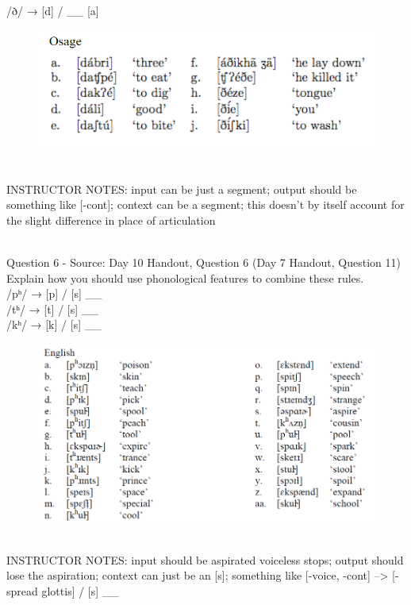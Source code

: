 \documentclass[12pt]{article}
\begin{document}
/ð/ → {[d]} / \_\_ {[a]}

\begin{figure}[H]
\includegraphics{../images/osage.png}
\end{figure}

~\\
INSTRUCTOR NOTES: input can be just a segment; output should be something like [-cont]; context can be a segment; this doesn't by itself account for the slight difference in place of articulation


~\\

{\large Question 6} - Source: Day 10 Handout, Question 6 (Day 7 Handout, Question 11)\\

Explain how you should use phonological features to combine these rules.\\

/pʰ/ → {[p]} / {[s]} \_\_\\/tʰ/ → {[t]} / {[s]} \_\_\\/kʰ/ → {[k]} / {[s]} \_\_

\begin{figure}[H]
\includegraphics{../images/english_asp.png}
\end{figure}

~\\
INSTRUCTOR NOTES: input should be aspirated voiceless stops; output should lose the aspiration; context can just be an [s]; something like [-voice, -cont] --> [-spread glottis] / [s] \_\_
\end{document}

